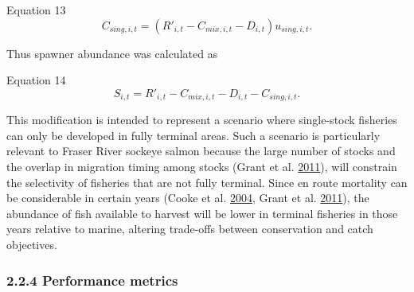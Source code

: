 \documentclass[11pt]{book}
\begin{document}
Equation 13 \[ C_{sing,i,t} = (R'_{i,t} - C_{mix,i,t} - D_{i,t})u_{sing,i,t}. \]

Thus spawner abundance was calculated as

Equation 14 \[ S_{i,t} = R'_{i,t} - C_{mix,i,t} - D_{i,t} - C_{sing,i,t}. \]

This modification is intended to represent a scenario where single-stock fisheries can only be developed in fully terminal areas. Such a scenario is particularly relevant to Fraser River sockeye salmon because the large number of stocks and the overlap in migration timing among stocks (Grant et al. \protect\hyperlink{ref-Grant2011}{2011}), will constrain the selectivity of fisheries that are not fully terminal. Since en route mortality can be considerable in certain years (Cooke et al. \protect\hyperlink{ref-Cooke2004}{2004}, Grant et al. \protect\hyperlink{ref-Grant2011}{2011}), the abundance of fish available to harvest will be lower in terminal fisheries in those years relative to marine, altering trade-offs between conservation and catch objectives.

\subsubsection{2.2.4 Performance metrics}\label{performance-metrics}
\end{document}
